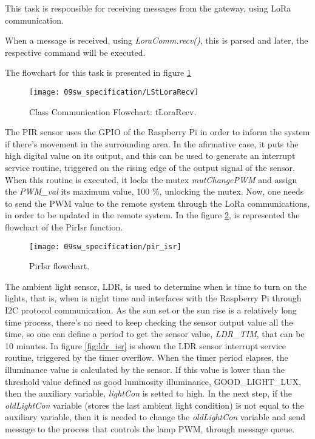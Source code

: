 \clearpage
{}

This task is responsible for receiving messages from the gateway, using LoRa communication.

When a message is received, using \textit{LoraComm.recv()}, this is parsed and later, the respective command will be executed.

The flowchart for this task is presented in figure \ref{fig:LStLoraRecv}

\begin{figure}[H]
	\centering		\texttt{[image: 09sw\_specification/LStLoraRecv]}
	\caption{Class Communication Flowchart: tLoraRecv.}
	\label{fig:LStLoraRecv}
\end{figure}


The PIR sensor uses the GPIO of the Raspberry Pi in order to inform the system if there's movement in the surrounding area. In the afirmative case, it puts the high digital value on its output, and this can be used to generate an interrupt service routine, triggered on the rising edge of the output signal of the sensor. When this routine is executed, it locks the mutex \textit{mutChangePWM} and assign the \textit{PWM\_val} its maximum value, 100 \%, unlocking the mutex. Now, one needs to send the PWM value to the remote system through the LoRa communications, in order to be updated in the remote system. In the figure \ref{fig:pir_isr}, is represented the flowchart of the PirIsr function.

\begin{figure}[H]
	\centering
	\texttt{[image: 09sw\_specification/pir\_isr]}
	\caption{PirIsr flowchart.}
	\label{fig:pir_isr}
\end{figure}

The ambient light sensor, LDR, is used to determine when is time to turn on the lights, that is, when is night time and interfaces with the Raspberry Pi through I2C protocol communication. As the sun set or the sun rise is a relatively long time process, there's no need to keep checking the sensor output value all the time, so one can define a period to get the sensor value, \textit{LDR\_TIM}, that can be 10 minutes. In figure \ref{fig:ldr_isr} is shown the LDR sensor interrupt service routine, triggered by the timer overflow. When the timer period elapses, the illuminance value is calculated by the sensor. If this value is lower than the threshold value defined as good luminosity illuminance, GOOD\_LIGHT\_LUX, then the auxiliary variable, \textit{lightCon} is setted to high. In the next step, if the \textit{oldLightCon} variable (stores the last ambient light condition) is not equal to the auxiliary variable, then it is needed to change the \textit{oldLightCon} variable and send message to the process that controls the lamp PWM, through message queue. 

